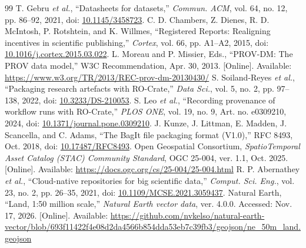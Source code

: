 \begin{thebibliography}{99}
 T. Gebru \emph{et al.}, ``Datasheets for datasets,'' \emph{Commun. ACM}, vol. 64, no. 12, pp. 86--92, 2021, doi: \href{https://doi.org/10.1145/3458723}{10.1145/3458723}.
 C. D. Chambers, Z. Dienes, R. D. McIntosh, P. Rotshtein, and K. Willmes, ``Registered Reports: Realigning incentives in scientific publishing,'' \emph{Cortex}, vol. 66, pp. A1--A2, 2015, doi: \href{https://doi.org/10.1016/j.cortex.2015.03.022}{10.1016/j.cortex.2015.03.022}.
 L. Moreau and P. Missier, Eds., ``PROV-DM: The PROV data model,'' W3C Recommendation, Apr. 30, 2013. [Online]. Available: \url{https://www.w3.org/TR/2013/REC-prov-dm-20130430/}
 S. Soiland-Reyes \emph{et al.}, ``Packaging research artefacts with RO-Crate,'' \emph{Data Sci.}, vol. 5, no. 2, pp. 97--138, 2022, doi: \href{https://doi.org/10.3233/DS-210053}{10.3233/DS-210053}.
 S. Leo \emph{et al.}, ``Recording provenance of workflow runs with RO-Crate,'' \emph{PLOS ONE}, vol. 19, no. 9, Art. no. e0309210, 2024, doi: \href{https://doi.org/10.1371/journal.pone.0309210}{10.1371/journal.pone.0309210}.
 J. Kunze, J. Littman, E. Madden, J. Scancella, and C. Adams, ``The BagIt file packaging format (V1.0),'' RFC 8493, Oct. 2018, doi: \href{https://doi.org/10.17487/RFC8493}{10.17487/RFC8493}.
 Open Geospatial Consortium, \emph{SpatioTemporal Asset Catalog (STAC) Community Standard}, OGC 25-004, ver. 1.1, Oct. 2025. [Online]. Available: \url{https://docs.ogc.org/cs/25-004/25-004.html}
 R. P. Abernathey \emph{et al.}, ``Cloud-native repositories for big scientific data,'' \emph{Comput. Sci. Eng.}, vol. 23, no. 2, pp. 26--35, 2021, doi: \href{https://doi.org/10.1109/MCSE.2021.3059437}{10.1109/MCSE.2021.3059437}.
 Natural Earth, ``Land, 1:50 million scale,'' \emph{Natural Earth vector data}, ver. 4.0.0. Accessed: Nov. 17, 2026. [Online]. Available: \url{https://github.com/nvkelso/natural-earth-vector/blob/693f11422f4e08d2da4566b854dda53eb7c39fb3/geojson/ne_50m_land.geojson}
\end{thebibliography}

